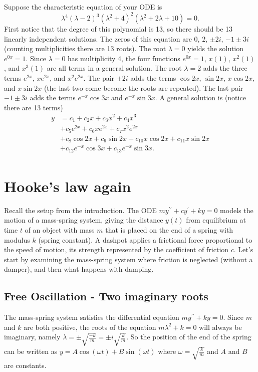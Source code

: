 \begin{example}
Suppose the characteristic equation of your ODE is $$\lambda^4(\lambda-2)^3(\lambda^2+4)^2(\lambda^2+2\lambda+10)=0.$$ 
First notice that the degree of this polynomial is 13, so there should be 13 linearly independent solutions.
The zeros of this equation are $0$, $2$, $\pm 2i$, $-1\pm 3i$ (counting multiplicities there are 13 roots). The root $\lambda = 0$ yields the solution $e^{0x} = 1$. 
Since $\lambda = 0$ has multiplicity 4, the four functions $e^{0x}=1$, $x(1)$, $x^2(1)$, and $x^3(1)$ are all terms in a general solution.  The root $\lambda = 2$ adds the three terms $e^{2x}$, $xe^{2x}$, and $x^2e^{2x}$. The pair $\pm 2i$ adds the terms $\cos 2x$, $\sin 2x$, $x\cos 2x$, and $x\sin 2x$ (the last two come become the roots are repeated). The last pair $-1\pm 3i$ adds the terms $e^{-x}\cos 3x$ and $e^{-x}\sin 3x$.  A general solution is (notice there are 13 terms)
\begin{align*}
y&=c_1+ c_2 x +c_3 x^2 +c_4 x^3 \\
&+c_5 e^{2x} +c_6 xe^{2x} +c_7 x^2e^{2x} \\
&+c_8 \cos 2x+c_9 \sin 2x+c_{10} x\cos 2x+c_{11}x\sin 2x\\
&+c_{12}e^{-x}\cos 3x+c_{13}e^{-x}\sin 3x.\\
\end{align*}
\end{example}

\section{Hooke's law again}
Recall the setup from the introduction. The ODE $my^{\prime\prime}+cy^\prime+ky=0$ models the motion of a mass-spring system, giving the distance $y(t)$ from equilibrium at time $t$ of an object with mass $m$ that is placed on the end of a spring with modulus $k$ (spring constant). A dashpot applies a frictional force proportional to the speed of motion, its strength represented by the coefficient of friction $c$. Let's start by examining the mass-spring system where friction is neglected (without a damper), and then what happens with damping.

\subsection{Free Oscillation - Two imaginary roots}
The mass-spring system satisfies the differential equation $my^{\prime\prime}+ky=0$. Since $m$ and $k$ are both positive, the roots of the equation $m\lambda^2 +k=0$ will always be imaginary, namely $\lambda = \pm\sqrt{\frac{-k}{m}} =  \pm i\sqrt{\frac{k}{m}} $.  So the position of the end of the spring can be written as $y=A \cos(\omega t)+B\sin(\omega t)$ where $\omega=\sqrt{\frac{k}{m}}$ and $A$ and $B$ are constants.  

